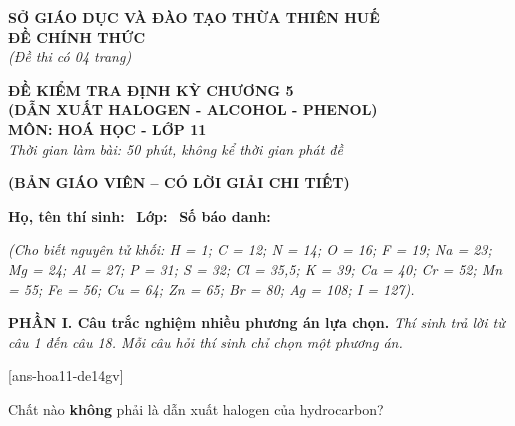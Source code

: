 \documentclass[12pt,a4paper]{article}
\begin{document}
\thispagestyle{firstpage}

\noindent
\begin{minipage}[t]{0.44\textwidth}
	\centering\fontsize{10pt}{12pt}\selectfont
	\textbf{SỞ GIÁO DỤC VÀ ĐÀO TẠO THỪA THIÊN HUẾ}\\
	\textbf{ĐỀ CHÍNH THỨC}\\
	\textit{(Đề thi có 04 trang)}
\end{minipage}\hfill
\begin{minipage}[t]{0.54\textwidth}
	\centering\fontsize{10.5pt}{13pt}\selectfont
	\textbf{ĐỀ KIỂM TRA ĐỊNH KỲ CHƯƠNG 5}\\
	\textbf{(DẪN XUẤT HALOGEN - ALCOHOL - PHENOL)}\\
	\textbf{MÔN: HOÁ HỌC - LỚP 11}\\
	\textit{Thời gian làm bài: 50 phút, không kể thời gian phát đề}
	
	\smallskip
\end{minipage}

\smallskip
\begin{center}
	{\color{hfRed}\textbf{\large (BẢN GIÁO VIÊN -- CÓ LỜI GIẢI CHI TIẾT)}}
\end{center}

\smallskip
\noindent\hrulefill
\smallskip

\noindent\textbf{Họ, tên thí sinh:} \dotfill\ \textbf{Lớp:} \dotfill\ \textbf{Số báo danh:} \dotfill

\smallskip
\noindent\textit{(Cho biết nguyên tử khối: H = 1; C = 12; N = 14; O = 16; F = 19; Na = 23; Mg = 24; Al = 27; P = 31; S = 32; Cl = 35,5; K = 39; Ca = 40; Cr = 52; Mn = 55; Fe = 56; Cu = 64; Zn = 65; Br = 80; Ag = 108; I = 127).}
\smallskip

\noindent\textbf{\large PHẦN I. Câu trắc nghiệm nhiều phương án lựa chọn.}
\textit{Thí sinh trả lời từ câu 1 đến câu 18. Mỗi câu hỏi thí sinh chỉ chọn một phương án.}
\vspace{0.2cm}

[ans-hoa11-de14gv]

\begin{ex}
Chất nào \textbf{không} phải là dẫn xuất halogen của hydrocarbon?
\choice
{}
{}
{\True {}}
{}
\end{ex}
\end{document}
